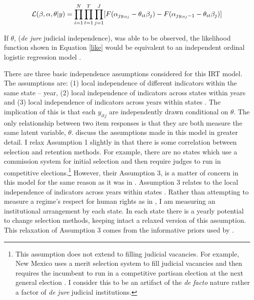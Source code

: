 \documentclass[12pt]{article}
\begin{document}
\begin{align}\label{like}
{\cal L} (\beta,\alpha,\theta|y)=\prod_{i=1}^{N}\prod_{t=1}^{T}\prod_{j=1}^{J}[F(\alpha_{jy_{itj}}-\theta_{it}\beta_j)-F(\alpha_{jy_{itj}-1}-\theta_{it}\beta_j)]
\end{align} 

If $\theta$, (\textit{de jure} judicial independence), was able to be observed, the likelihood function shown in Equation \ref{like} would be equivalent to an independent ordinal logistic regression model \citep[8]{Schnakenberg2014}.  

There are three basic independence assumptions considered for this IRT model.  The assumptions are: (1) local independence of different indicators within the same state -- year, (2) local independence of indicators across states within years and (3) local independence of indicators across years within states \citep[8]{Schnakenberg2014}.  The implication of this is that each $y_{itj}$ are independently drawn conditional on $\theta$.  The only relationship between two item responses is that they are both measure the same latent variable, $\theta$. \citet[8]{Schnakenberg2014} discuss the assumptions made in this model in greater detail.  I relax Assumption 1 slightly in that there is some correlation between selection and retention methods. For example, there are no states which use a commission system for initial selection and then require judges to run in competitive elections.\footnote{This assumption does not extend to filling judicial vacancies.  For example, New Mexico uses a merit selection system to fill judicial vacancies and then requires the incumbent to run in a competitive partisan election at the next general election \citep{AJS}.  I consider this to be an artifact of the \textit{de facto} nature rather a factor of \textit{de jure} judicial institutions.}  However, their Assumption 3, is a matter of concern in this model for the same reason as it was in \citet{Schnakenberg2014}.  Assumption 3 relates to the local independence of indicators across years within states \citep[8]{Schnakenberg2014}.  Rather than attempting to measure a regime's respect for human rights as in \citet{Schnakenberg2014}, I am measuring an institutional arrangement by each state.  In each state there is a yearly potential to change selection methods, keeping intact a relaxed version of this assumption.  This relaxation of Assumption 3 comes from the informative priors used by \citet[8]{Schnakenberg2014}.    
\end{document}
